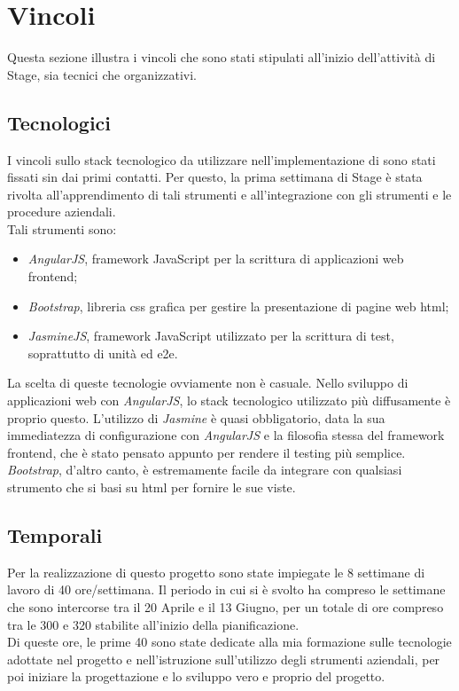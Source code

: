 
\section{Vincoli}
Questa sezione illustra i vincoli che sono stati stipulati all'inizio dell'attività di Stage, sia tecnici che organizzativi.

\subsection{Tecnologici}
I vincoli sullo stack tecnologico da utilizzare nell'implementazione di \myTitle{} sono stati fissati sin dai primi contatti. Per questo, la prima settimana di Stage è stata rivolta all'apprendimento di tali strumenti e all'integrazione con gli strumenti e le procedure aziendali.\\
Tali strumenti sono:
\begin{itemize}
	\item \emph{AngularJS}, framework JavaScript per la scrittura di applicazioni web frontend;
	\item \emph{Bootstrap}, libreria \gls{css} grafica per gestire la presentazione di pagine web \gls{html};
	\item \emph{JasmineJS}, framework JavaScript utilizzato per la scrittura di test, soprattutto di unità ed \gls{e2e}. 
\end{itemize}
La scelta di queste tecnologie ovviamente non è casuale. Nello sviluppo di applicazioni web con \emph{AngularJS}, lo stack tecnologico utilizzato più diffusamente è proprio questo. L'utilizzo di \emph{Jasmine} è quasi obbligatorio, data la sua immediatezza di configurazione con \emph{AngularJS} e la filosofia stessa del framework frontend, che è stato pensato appunto per rendere il testing più semplice.\\
\emph{Bootstrap}, d'altro canto, è estremamente facile da integrare con qualsiasi strumento che si basi su \gls{html} per fornire le sue viste.

\subsection{Temporali}
Per la realizzazione di questo progetto sono state impiegate le 8 settimane di lavoro di 40 ore/settimana. Il periodo in cui si è svolto ha compreso le settimane che sono intercorse tra il 20 Aprile e il 13 Giugno, per un totale di ore compreso tra le 300 e 320 stabilite all'inizio della pianificazione.\\
Di queste ore, le prime 40 sono state dedicate alla mia formazione sulle tecnologie adottate nel progetto e nell'istruzione sull'utilizzo degli strumenti aziendali, per poi iniziare la progettazione e lo sviluppo vero e proprio del progetto.

